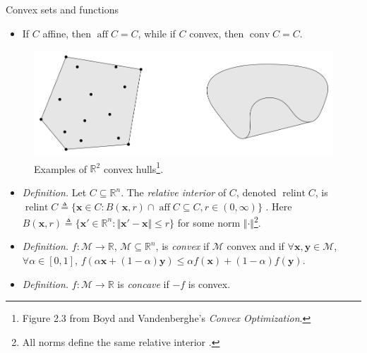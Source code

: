\documentclass{beamer}
\numberwithin{equation}{section}
\begin{document}
\begin{frame}{Convex sets and functions}
    \begin{itemize}
        \item
        If $ C $ affine, then $ \operatorname{aff} C = C $, while if $ C $
        convex, then $ \operatorname{conv} C = C $.
    \end{itemize}
    \begin{figure}
        \centering
        \vspace{-3 pt}
        \includegraphics[scale = 0.24]{bv_fig_2.3.png}
        \vspace{-10 pt}
        \caption{
            Examples of $ \mathbb{R}^2 $ convex hulls\footnote{
                Figure 2.3 from Boyd and Vandenberghe's
                \textit{Convex Optimization}.
            }.
        }
        \vspace{-10 pt}
    \end{figure}
    \begin{itemize}
        \item
        \textit{Definition.} Let $ C \subseteq \mathbb{R}^n $. The
        \textit{relative interior} of $ C $, denoted
        $ \operatorname{relint} C $, is $ \operatorname{relint} C \triangleq 
        \{\mathbf{x} \in C : B(\mathbf{x}, r) \cap \operatorname{aff} C
        \subseteq C, r \in (0, \infty)\} $ \cite{bv_convex_opt}. Here
        $ B(\mathbf{x}, r) \triangleq \{\mathbf{x}' \in \mathbb{R}^n :
        \Vert\mathbf{x}' - \mathbf{x}\Vert \le r\} $ for some norm
        $ \Vert\cdot\Vert $\footnote{
            All norms define the same relative interior \cite{bv_convex_opt}.        
        }.

        \item
        \textit{Definition.} $ f : \mathcal{M} \rightarrow
        \mathbb{R} $, $ \mathcal{M} \subseteq \mathbb{R}^n $, is
        \textit{convex} if $ \mathcal{M} $ convex and if
        $ \forall \mathbf{x}, \mathbf{y} \in \mathcal{M} $,
        $ \forall \alpha \in [0, 1] $,
        $ f(\alpha\mathbf{x} + (1 - \alpha)\mathbf{y}) \le
        \alpha f(\mathbf{x}) + (1 - \alpha)f(\mathbf{y}) $.

        \item
        \textit{Definition.} $ f : \mathcal{M} \rightarrow \mathbb{R} $ is
        \textit{concave} if $ -f $ is convex.
    \end{itemize}

    \bigskip
\end{frame}
\end{document}
